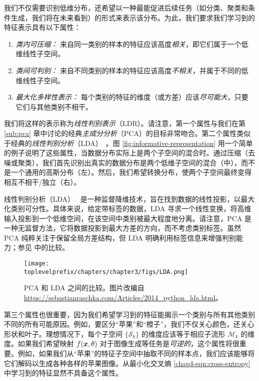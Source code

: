 \documentclass[../../book-main_zh.tex]{subfiles}
\begin{document}
我们不仅需要识别低维分布，还希望以一种最能促进后续任务（如分类、聚类和条件生成，我们将在未来看到）的形式来表示该分布。为此，我们要求我们学习到的特征表示具有以下属性：
\begin{enumerate}
	\item {\em 类内可压缩：} 来自同一类别的样本的特征应该高度{\em 相关}，即它们属于一个低维线性子空间。
	\item {\em 类间可判别：} 来自不同类别的样本的特征应该高度{\em 不相关}，并属于不同的低维线性子空间。
	\item {\em 最大化多样性表示：} 每个类别的特征的维度（或方差）应该{\em 尽可能大}，只要它们与其他类别不相干。
\end{enumerate}
我们将这样的表示称为{\em 线性判别表示}（LDR）。请注意，第一个属性与我们在第 \ref{sub:pca} 章中讨论的经典{\em 主成分分析}（PCA）的目标非常吻合。第二个属性类似于经典的{\em 线性判别分析}（LDA）~\cite{HastieTiFr09}。图 \ref{fig:informative-representation} 用一个简单的例子说明了这些属性，当数据分布实际上是两个子空间的混合时。通过压缩（去噪或聚类），我们首先识别出真实的数据分布是两个低维子空间的混合（中），而不是一个通用的高斯分布（左）。然后，我们希望转换分布，使两个子空间最终变得相互不相干/独立（右）。

\begin{remark}
    线性判别分析（LDA）~\cite{HastieTiFr09} 是一种监督降维技术，旨在找到数据的线性投影，以最大化类别可分性。具体来说，给定带标签的数据，LDA 寻求一个线性变换，将高维输入投影到一个低维空间，在该空间中类别被最大程度地分离。请注意，PCA 是一种无监督方法，它将数据投影到最大方差的方向，而不考虑类别标签。虽然 PCA 纯粹关注于保留全局方差结构，但 LDA 明确利用标签信息来增强判别能力；参见  中的比较。
\end{remark}

\begin{figure}
	\centering
	\texttt{[image: \\toplevelprefix/chapters/chapter3/figs/LDA.png]}\vspace{-0.1in}
	\caption{PCA 和 LDA 之间的比较。图片改编自 \url{https://sebastianraschka.com/Articles/2014_python_lda.html}。}
	\label{fig:LDA}
\end{figure}


第三个属性也很重要，因为我们希望学习到的特征能揭示一个类别与所有其他类别不同的所有可能原因。例如，要区分“苹果”和“橙子”，我们不仅关心颜色，还关心形状和叶子。理想情况下，每个子空间 $\{\mathcal{S}_k\}$ 的维度应该等于相应子流形 $\mathcal{M}_k$ 的维度。如果我们希望映射 $f(\bm{x},\theta)$ 对于图像生成等任务是{\em 可逆的}，这个属性将很重要。例如，如果我们从“苹果”的特征子空间中抽取不同的样本点，我们应该能够将它们解码以生成各种各样的苹果图像。从最小化交叉熵 \eqref{chap4-eqn:cross-entropy} 中学习到的特征显然不具备这个属性。
\end{document}
